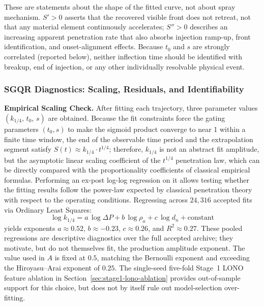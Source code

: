 These are statements about the shape of the fitted curve, not about spray mechanism. \(S'>0\) asserts that the recovered visible front does not retreat, not that any material element continuously accelerates; \(S''>0\) describes an increasing apparent penetration rate that also absorbs injection ramp-up, front identification, and onset-alignment effects. Because \(t_0\) and \(s\) are strongly correlated (reported below), neither inflection time should be identified with breakup, end of injection, or any other individually resolvable physical event.

\subsubsection{SGQR Diagnostics: Scaling, Residuals, and Identifiability}

\textbf{Empirical Scaling Check.} After fitting each trajectory, three parameter values \((k_{1/4},\,t_0,\,s)\) are obtained. Because the fit constraints force the gating parameters \((t_0,s)\) to make the sigmoid product converge to near 1 within a finite time window, the end of the observable time period and the extrapolation segment satisfy \(S(t)\approx k_{1/4}\cdot t^{1/4}\); therefore, \(k_{1/4}\) is not an abstract fit amplitude, but the asymptotic linear scaling coefficient of the \(t^{1/4}\) penetration law, which can be directly compared with the proportionality coefficients of classical empirical formulas. Performing an ex-post log-log regression on it allows testing whether the fitting results follow the power-law expected by classical penetration theory with respect to the operating conditions. Regressing across \(24{,}316\) accepted fits via Ordinary Least Squares:
\[
  \log k_{1/4} = a\,\log\Delta P + b\,\log\rho_a + c\,\log d_n + \text{constant}
\]
yields exponents \(a\approx 0.52\), \(b\approx -0.23\), \(c\approx 0.26\), and \(R^2\approx 0.27\). These pooled regressions are descriptive diagnostics over the full accepted archive; they motivate, but do not themselves fit, the production amplitude exponent. The value used in \(A\) is fixed at \(0.5\), matching the Bernoulli exponent and exceeding the Hiroyasu--Arai exponent of \(0.25\). The single-seed five-fold Stage~1 LONO feature ablation in Section~\ref{sec:stage1-lono-ablation} provides out-of-sample support for this choice, but does not by itself rule out model-selection over-fitting.

